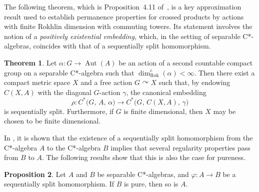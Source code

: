 \documentclass[10pt]{amsart}
\numberwithin{equation}{section}
\theoremstyle{definition}
\newtheorem{thm}{Theorem}[section]
\newtheorem{prp}[thm]{Proposition}
\newcommand{\af}{\alpha}
\newcommand{\gm}{\gamma}
\newcommand{\ph}{\varphi}
\newcommand{\Aut}{{\operatorname{Aut}}}
\newcommand{\RD}{{\operatorname{dim}}_{\operatorname{Rok}}^{\operatorname{c}}}
\begin{document}
The following theorem, which is Proposition~4.11 of~\cite{GdlHrbStg},
is a key approximation result used to establish permanence properties
for crossed products by actions with finite Rokhlin dimension with
commuting towers. Its statement involves the notion of a
\emph{positively existential embedding}, which, in the setting of
separable C*-algebras, coincides with that of a sequentially
split homomorphism.


\begin{thm}\label{2003_rokhlin_dimension}
Let $\alpha \colon G \to \Aut (A)$ be an action
of a second countable compact group on a separable C*-algebra
such that $\RD (\alpha) < \infty$.
Then there exist a compact metric space $X$
and a free action $G \curvearrowright X$ such that, by endowing $C (X, A)$ with the diagonal $G$-action $\gamma$, the
canonical embedding
\[
\rho \colon C^* \bigl( G, \, A, \, \af \bigr) \to
C^* \bigl( G, \, C(X,A), \, \gm \bigr)
\]
is sequentially split.
Furthermore, if $G$ is finite dimensional,
then $X$ may be chosen to be finite dimensional.
\end{thm}

In \cite{barlak}, it is shown that the existence of a sequentially split homomorphism from the C*-algebra $A$ to the C*-algebra $B$
implies that several regularity properties pass from $B$ to $A$.
The following results show that this is also the case for pureness.

\begin{prp}\label{0704_seq_split_comparison_divisibility}
Let $A$  and $B$ be separable C*-algebras, and
$\ph \colon A\rightarrow B$ be a sequentially split homomorphism. If $B$ is pure, then so is $A$.
\end{prp}
\end{document}

